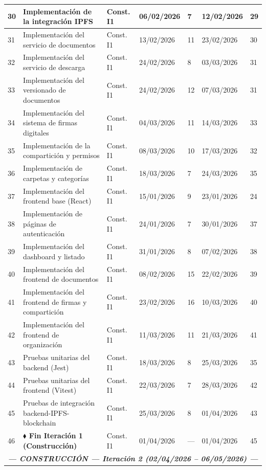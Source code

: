 \documentclass[11pt, a4paper]{article}
\begin{document}
\begin{longtable}{|p{0.6cm}|p{5.2cm}|p{2.5cm}|p{1.9cm}|p{0.9cm}|p{1.9cm}|p{1.4cm}|}
\hline
30 & Implementación de la integración IPFS & Const. I1 & 06/02/2026 & 7 & 12/02/2026 & 29 \\
\hline
31 & Implementación del servicio de documentos & Const. I1 & 13/02/2026 & 11 & 23/02/2026 & 30 \\
\hline
32 & Implementación del servicio de descarga & Const. I1 & 24/02/2026 & 8 & 03/03/2026 & 31 \\
\hline
33 & Implementación del versionado de documentos & Const. I1 & 24/02/2026 & 12 & 07/03/2026 & 31 \\
\hline
34 & Implementación del sistema de firmas digitales & Const. I1 & 04/03/2026 & 11 & 14/03/2026 & 33 \\
\hline
35 & Implementación de la compartición y permisos & Const. I1 & 08/03/2026 & 10 & 17/03/2026 & 32 \\
\hline
36 & Implementación de carpetas y categorías & Const. I1 & 18/03/2026 & 7 & 24/03/2026 & 35 \\
\hline
37 & Implementación del frontend base (React) & Const. I1 & 15/01/2026 & 9 & 23/01/2026 & 24 \\
\hline
38 & Implementación de páginas de autenticación & Const. I1 & 24/01/2026 & 7 & 30/01/2026 & 37 \\
\hline
39 & Implementación del dashboard y listado & Const. I1 & 31/01/2026 & 8 & 07/02/2026 & 38 \\
\hline
40 & Implementación del frontend de documentos & Const. I1 & 08/02/2026 & 15 & 22/02/2026 & 39 \\
\hline
41 & Implementación del frontend de firmas y compartición & Const. I1 & 23/02/2026 & 16 & 10/03/2026 & 40 \\
\hline
42 & Implementación del frontend de organización & Const. I1 & 11/03/2026 & 11 & 21/03/2026 & 41 \\
\hline
43 & Pruebas unitarias del backend (Jest) & Const. I1 & 18/03/2026 & 8 & 25/03/2026 & 35 \\
\hline
44 & Pruebas unitarias del frontend (Vitest) & Const. I1 & 22/03/2026 & 7 & 28/03/2026 & 42 \\
\hline
45 & Pruebas de integración backend-IPFS-blockchain & Const. I1 & 25/03/2026 & 8 & 01/04/2026 & 43 \\
\hline
46 & \textbf{$\blacklozenge$ Fin Iteración 1 (Construcción)} & Const. I1 & 01/04/2026 & --- & 01/04/2026 & 45 \\
\hline
\multicolumn{7}{|c|}{\textit{\textbf{--- CONSTRUCCIÓN --- Iteración 2 (02/04/2026 -- 06/05/2026) ---}}} \\

\end{longtable}
\end{document}
